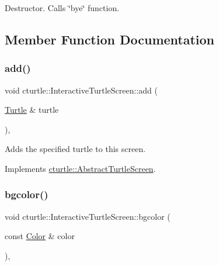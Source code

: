 Destructor. Calls \char`\"{}bye\char`\"{} function. 

\subsection{Member Function Documentation}
\mbox{\label{classcturtle_1_1InteractiveTurtleScreen_ab9696275e4a7b10225cfe10e48fd8c89}} 
\subsubsection{\texorpdfstring{add()}{add()}}
{\footnotesize\ttfamily void cturtle\+::\+Interactive\+Turtle\+Screen\+::add (\begin{DoxyParamCaption}\item[{\hyperlink{classcturtle_1_1Turtle}{Turtle} \&}]{turtle }\end{DoxyParamCaption})\hspace{0.3cm}{\ttfamily [inline]}, {\ttfamily [virtual]}}

Adds the specified turtle to this screen. 

Implements \hyperlink{classcturtle_1_1AbstractTurtleScreen}{cturtle\+::\+Abstract\+Turtle\+Screen}.

\mbox{\label{classcturtle_1_1InteractiveTurtleScreen_acb5441704b45a01830d69df46a23732f}} 
\subsubsection{\texorpdfstring{bgcolor()}{bgcolor()}\hspace{0.1cm}{\footnotesize\ttfamily [1/2]}}
{\footnotesize\ttfamily void cturtle\+::\+Interactive\+Turtle\+Screen\+::bgcolor (\begin{DoxyParamCaption}\item[{const \hyperlink{classcturtle_1_1Color}{Color} \&}]{color }\end{DoxyParamCaption})\hspace{0.3cm}{\ttfamily [inline]}, {\ttfamily [virtual]}}

